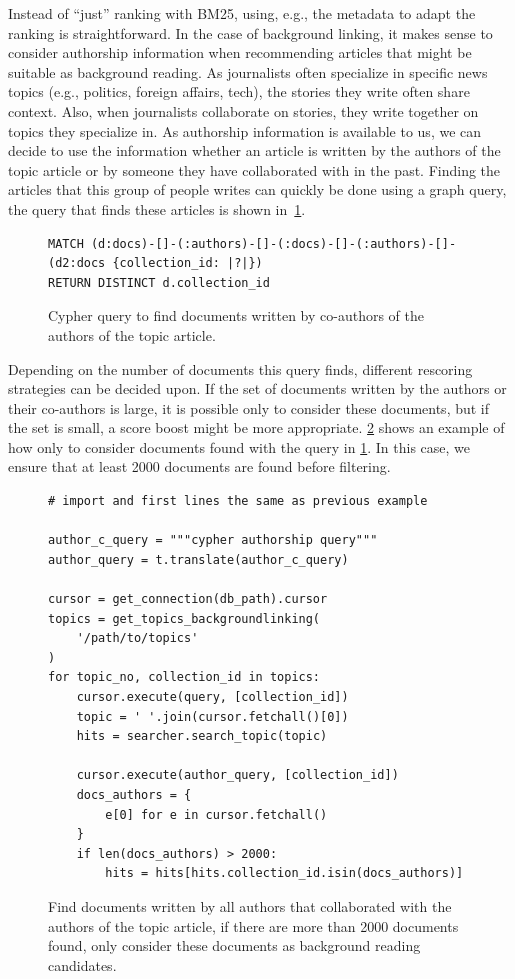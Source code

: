 \noindent Instead of ``just'' ranking with BM25, using, e.g., the metadata to adapt the ranking is straightforward. In the case of background linking, it makes sense to consider authorship information when recommending articles that might be suitable as background reading. As journalists often specialize in specific news topics (e.g., politics, foreign affairs, tech), the stories they write often share context. Also, when journalists collaborate on stories, they write together on topics they specialize in. As authorship information is available to us, we can decide to use the information whether an article is written by the authors of the topic article or by someone they have collaborated with in the past. Finding the articles that this group of people writes can quickly be done using a graph query, the query that finds these articles is shown in~\cref{fig:author-cypher}.

\begin{figure}
	\begin{verbatim}
MATCH (d:docs)-[]-(:authors)-[]-(:docs)-[]-(:authors)-[]-(d2:docs {collection_id: |?|}) 
RETURN DISTINCT d.collection_id
	\end{verbatim}
	\caption{Cypher query to find documents written by co-authors of the authors of the topic article.}
	\label{fig:author-cypher}
\end{figure}

\noindent Depending on the number of documents this query finds, different rescoring strategies can be decided upon. If the set of documents written by the authors or their co-authors is large, it is possible only to consider these documents, but if the set is small, a score boost might be more appropriate. \cref{fig:authors-code} shows an example of how only to consider documents found with the query in \cref{fig:author-cypher}. In this case, we ensure that at least 2000 documents are found before filtering.

\begin{figure}
	\begin{verbatim}
# import and first lines the same as previous example

author_c_query = """cypher authorship query"""
author_query = t.translate(author_c_query)

cursor = get_connection(db_path).cursor
topics = get_topics_backgroundlinking(
    '/path/to/topics'
)
for topic_no, collection_id in topics:
    cursor.execute(query, [collection_id])
    topic = ' '.join(cursor.fetchall()[0])
    hits = searcher.search_topic(topic)

    cursor.execute(author_query, [collection_id])
    docs_authors = {
        e[0] for e in cursor.fetchall()
    }
    if len(docs_authors) > 2000:
        hits = hits[hits.collection_id.isin(docs_authors)]
	\end{verbatim}
	\caption{Find documents written by all authors that collaborated with the authors of the topic article, if there are more than 2000 documents found, only consider these documents as background reading candidates.}
	\label{fig:authors-code}
\end{figure}

